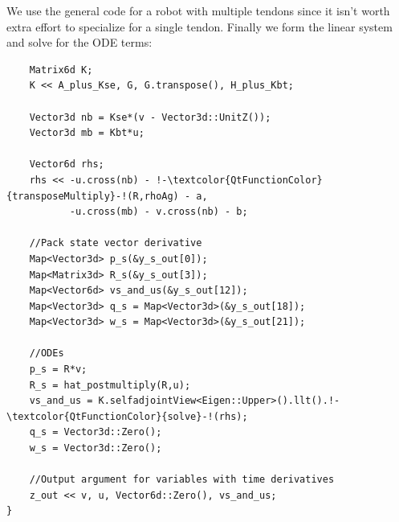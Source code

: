\documentclass[12pt]{article}
\begin{document}
We use the general code for a robot with multiple tendons since it isn't worth extra effort to specialize for a single tendon. Finally we form the linear system and solve for the ODE terms:
\begin{lstlisting}
    Matrix6d K;
    K << A_plus_Kse, G, G.transpose(), H_plus_Kbt;

    Vector3d nb = Kse*(v - Vector3d::UnitZ());
    Vector3d mb = Kbt*u;

    Vector6d rhs;
    rhs << -u.cross(nb) - !-\textcolor{QtFunctionColor}{transposeMultiply}-!(R,rhoAg) - a,
           -u.cross(mb) - v.cross(nb) - b;

    //Pack state vector derivative
    Map<Vector3d> p_s(&y_s_out[0]);
    Map<Matrix3d> R_s(&y_s_out[3]);
    Map<Vector6d> vs_and_us(&y_s_out[12]);
    Map<Vector3d> q_s = Map<Vector3d>(&y_s_out[18]);
    Map<Vector3d> w_s = Map<Vector3d>(&y_s_out[21]);

    //ODEs
    p_s = R*v;
    R_s = hat_postmultiply(R,u);
    vs_and_us = K.selfadjointView<Eigen::Upper>().llt().!-\textcolor{QtFunctionColor}{solve}-!(rhs);
    q_s = Vector3d::Zero();
    w_s = Vector3d::Zero();

    //Output argument for variables with time derivatives
    z_out << v, u, Vector6d::Zero(), vs_and_us;
}
\end{lstlisting}
\end{document}
